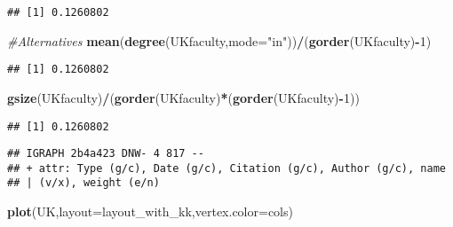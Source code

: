 \documentclass[
]{article}
\newenvironment{Shaded}{\begin{snugshade}}{\end{snugshade}}
\newcommand{\CommentTok}[1]{\textcolor[rgb]{0.56,0.35,0.01}{\textit{#1}}}
\newcommand{\DataTypeTok}[1]{\textcolor[rgb]{0.13,0.29,0.53}{#1}}
\newcommand{\DecValTok}[1]{\textcolor[rgb]{0.00,0.00,0.81}{#1}}
\newcommand{\KeywordTok}[1]{\textcolor[rgb]{0.13,0.29,0.53}{\textbf{#1}}}
\newcommand{\NormalTok}[1]{#1}
\newcommand{\OperatorTok}[1]{\textcolor[rgb]{0.81,0.36,0.00}{\textbf{#1}}}
\newcommand{\StringTok}[1]{\textcolor[rgb]{0.31,0.60,0.02}{#1}}
\begin{document}
\begin{verbatim}
## [1] 0.1260802
\end{verbatim}

\begin{Shaded}
\begin{Highlighting}[]
\CommentTok{#Alternatives}
\KeywordTok{mean}\NormalTok{(}\KeywordTok{degree}\NormalTok{(UKfaculty,}\DataTypeTok{mode=}\StringTok{"in"}\NormalTok{))}\OperatorTok{/}\NormalTok{(}\KeywordTok{gorder}\NormalTok{(UKfaculty)}\OperatorTok{-}\DecValTok{1}\NormalTok{)}
\end{Highlighting}
\end{Shaded}

\begin{verbatim}
## [1] 0.1260802
\end{verbatim}

\begin{Shaded}
\begin{Highlighting}[]
\KeywordTok{gsize}\NormalTok{(UKfaculty)}\OperatorTok{/}\NormalTok{(}\KeywordTok{gorder}\NormalTok{(UKfaculty)}\OperatorTok{*}\NormalTok{(}\KeywordTok{gorder}\NormalTok{(UKfaculty)}\OperatorTok{-}\DecValTok{1}\NormalTok{))}
\end{Highlighting}
\end{Shaded}

\begin{verbatim}
## [1] 0.1260802
\end{verbatim}

\begin{Shaded}
\end{Shaded}

\begin{verbatim}
## IGRAPH 2b4a423 DNW- 4 817 -- 
## + attr: Type (g/c), Date (g/c), Citation (g/c), Author (g/c), name
## | (v/x), weight (e/n)
\end{verbatim}

\begin{Shaded}
\begin{Highlighting}[]
\KeywordTok{plot}\NormalTok{(UK,}\DataTypeTok{layout=}\NormalTok{layout_with_kk,}\DataTypeTok{vertex.color=}\NormalTok{cols)}
\end{Highlighting}
\end{Shaded}
\end{document}
